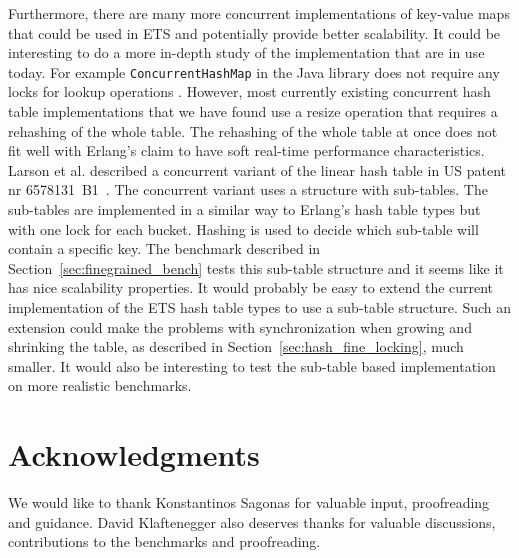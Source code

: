 \documentclass[aps,pre,preprint,nofootinbib]{revtex4}
\begin{document}
Furthermore, there are many more concurrent implementations of key-value maps that could be used in ETS and potentially provide better scalability.
It could be interesting to do a more in-depth study of the implementation that are in use today.
For example \verb|ConcurrentHashMap| in the Java library does not require any locks for lookup operations \cite{BrianConcHashMap}.
However, most currently existing concurrent hash table implementations that we have found use a resize operation that requires a rehashing of the whole table.
The rehashing of the whole table at once does not fit well with Erlang's claim to have soft real-time performance characteristics.
Larson et al. described a concurrent variant of the linear hash table in US patent nr 6578131~B1~\cite{USPATENT6578131B1}.
The concurrent variant uses a structure with sub-tables.
The sub-tables are implemented in a similar way to Erlang's hash table types but with one lock for each bucket.
Hashing is used to decide which sub-table will contain a specific key.
The benchmark described in Section~\ref{sec:finegrained_bench} tests this sub-table structure and it seems like it has nice scalability properties. 
It would probably be easy to extend the current implementation of the ETS hash table types to use a sub-table structure.
Such an extension could make the problems with synchronization when growing and shrinking the table, as described in Section~\ref{sec:hash_fine_locking}, much smaller.
It would also be interesting to test the sub-table based implementation on more realistic benchmarks.

\section{Acknowledgments}
 We would like to thank Konstantinos Sagonas for valuable input, proofreading and guidance. 
 David Klaftenegger also deserves thanks for valuable discussions, contributions to the benchmarks and proofreading.




\end{document}
